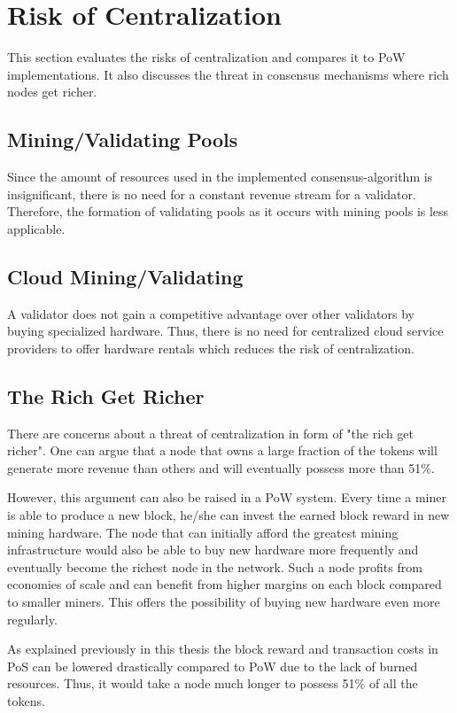 \section{Risk of Centralization}

This section evaluates the risks of centralization and compares it to PoW implementations. It also discusses the threat in consensus mechanisms where rich nodes get richer.

\subsection{Mining/Validating Pools}
Since the amount of resources used in the implemented consensus-algorithm is insignificant, there is no need for a constant revenue stream for a validator. Therefore, the formation of validating pools as it occurs with mining pools is less applicable.

\subsection{Cloud Mining/Validating}
A validator does not gain a competitive advantage over other validators by buying specialized hardware. Thus, there is no need for centralized cloud service providers to offer hardware rentals which reduces the risk of centralization.

\subsection{The Rich Get Richer}
There are concerns about a threat of centralization in form of "the rich get richer". One can argue that a node that owns a large fraction of the tokens will generate more revenue than others and will eventually possess more than 51\%. 

However, this argument can also be raised in a PoW system. Every time a miner is able to produce a new block, he/she can invest the earned block reward in new mining hardware. The node that can initially afford the greatest mining infrastructure would also be able to buy new hardware more frequently and eventually become the richest node in the network. Such a node profits from economies of scale and can benefit from higher margins on each block compared to smaller miners. This offers the possibility of buying new hardware even more regularly. 

As explained previously in this thesis the block reward and transaction costs in PoS can be lowered drastically compared to PoW due to the lack of burned resources. Thus, it would take a node much longer to possess 51\% of all the tokens. 

